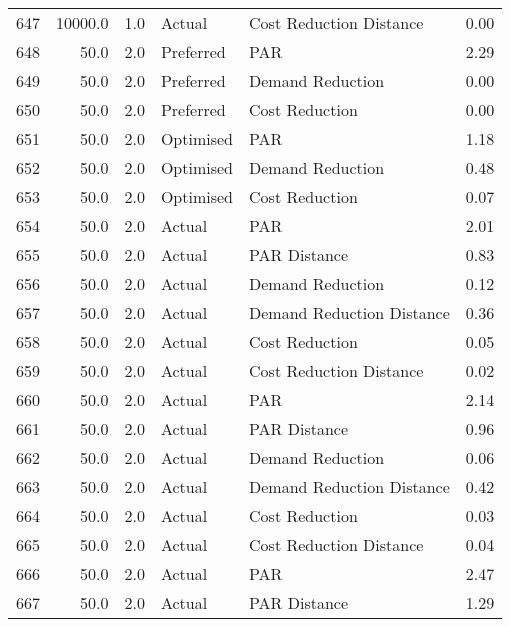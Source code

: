 \begin{longtable}{lrrllr}
647  &      10000.0 &     1.0 &         Actual &    Cost Reduction Distance &   0.00 \\
648  &         50.0 &     2.0 &      Preferred &                        PAR &   2.29 \\
649  &         50.0 &     2.0 &      Preferred &           Demand Reduction &   0.00 \\
650  &         50.0 &     2.0 &      Preferred &             Cost Reduction &   0.00 \\
651  &         50.0 &     2.0 &      Optimised &                        PAR &   1.18 \\
652  &         50.0 &     2.0 &      Optimised &           Demand Reduction &   0.48 \\
653  &         50.0 &     2.0 &      Optimised &             Cost Reduction &   0.07 \\
654  &         50.0 &     2.0 &         Actual &                        PAR &   2.01 \\
655  &         50.0 &     2.0 &         Actual &               PAR Distance &   0.83 \\
656  &         50.0 &     2.0 &         Actual &           Demand Reduction &   0.12 \\
657  &         50.0 &     2.0 &         Actual &  Demand Reduction Distance &   0.36 \\
658  &         50.0 &     2.0 &         Actual &             Cost Reduction &   0.05 \\
659  &         50.0 &     2.0 &         Actual &    Cost Reduction Distance &   0.02 \\
660  &         50.0 &     2.0 &         Actual &                        PAR &   2.14 \\
661  &         50.0 &     2.0 &         Actual &               PAR Distance &   0.96 \\
662  &         50.0 &     2.0 &         Actual &           Demand Reduction &   0.06 \\
663  &         50.0 &     2.0 &         Actual &  Demand Reduction Distance &   0.42 \\
664  &         50.0 &     2.0 &         Actual &             Cost Reduction &   0.03 \\
665  &         50.0 &     2.0 &         Actual &    Cost Reduction Distance &   0.04 \\
666  &         50.0 &     2.0 &         Actual &                        PAR &   2.47 \\
667  &         50.0 &     2.0 &         Actual &               PAR Distance &   1.29 \\

\end{longtable}
